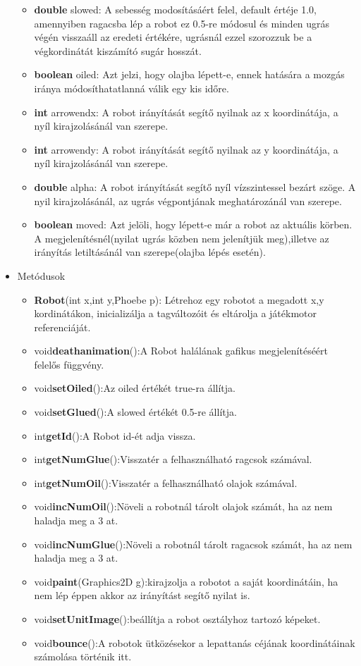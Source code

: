 \begin{itemize}
\begin{itemize}
		\item \textbf{double} slowed: A sebesség modosításáért felel, default értéje 1.0, amennyiben ragacsba lép a robot ez 0.5-re módosul és minden ugrás végén visszaáll az eredeti értékére, ugrásnál ezzel szorozzuk be a végkordinátát kiszámító sugár hosszát.
		\item \textbf{boolean} oiled: Azt jelzi, hogy olajba lépett-e, ennek hatására a mozgás iránya módosíthatatlanná válik egy kis időre. 
		\item \textbf{int} arrowendx: A robot irányítását segítő nyilnak az x koordinátája, a nyíl kirajzolásánál van szerepe.
		\item \textbf{int} arrowendy: A robot irányítását segítő nyilnak az y koordinátája, a nyíl kirajzolásánál van szerepe.
		\item \textbf{double} alpha: A robot irányítását segítő nyíl vízszintessel bezárt szöge. A nyil kirajzolásánál, az ugrás végpontjának meghatározánál van szerepe.
		\item \textbf{boolean} moved: Azt jelöli, hogy lépett-e már a robot az aktuális körben. A megjelenítésnél(nyilat ugrás közben nem jelenítjük meg),illetve az irányítás letiltásánál van szerepe(olajba lépés esetén).
	
\end{itemize}
\item Metódusok\\
	\begin{itemize}
		\item \textbf{Robot}(int x,int y,Phoebe p): Létrehoz egy robotot a megadott x,y kordinátákon, inicializálja a tagváltozóit és eltárolja a játékmotor referenciáját.
		\item void\textbf{deathanimation}():A Robot halálának gafikus megjelenítéséért felelős függvény.
		\item void\textbf{setOiled}():Az oiled értékét true-ra állítja. 
		\item void\textbf{setGlued}():A slowed értékét 0.5-re állítja. 
		\item int\textbf{getId}():A Robot id-ét adja vissza.
		\item int\textbf{getNumGlue}():Visszatér a felhasználható ragcsok számával.
		\item int\textbf{getNumOil}():Visszatér a felhasználható olajok számával.
		\item void\textbf{incNumOil}():Növeli a robotnál tárolt olajok számát, ha az nem haladja meg a 3 at.
		\item void\textbf{incNumGlue}():Növeli a robotnál tárolt ragacsok számát, ha az nem haladja meg a 3 at.
	\item void\textbf{paint}(Graphics2D g):kirajzolja a robotot a saját koordinátáin, ha nem lép éppen akkor az irányítást segítő nyilat is.
	\item void\textbf{setUnitImage}():beállítja a robot osztályhoz tartozó képeket.
\item void\textbf{bounce}():A robotok ütközésekor a lepattanás céjának  koordinátáinak számolása történik itt.


\end{itemize}
\end{itemize}
